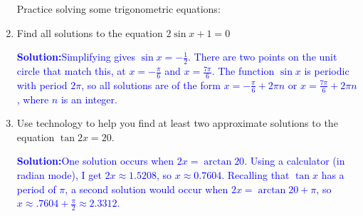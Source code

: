 \documentclass[letterpaper,11pt]{article}
\newcommand{\sol}[2]{\begin{minipage}[c][#1]{\linewidth}{\textcolor{blue}{\textbf{Solution:}}\quad \textcolor{blue}{#2}}\end{minipage}}
\newcommand{\sol}[2]{\begin{minipage}[c][#1]{\linewidth}{\vfill}\end{minipage}}
\begin{document}
\begin{enumerate}


\noindent Practice solving some trigonometric equations:

\item  Find all solutions to the equation $2\sin{x}+1=0$\\
\sol{1.2in}{Simplifying gives $\sin{x}=-\frac{1}{2}$.  There are two points on the unit circle that match this, at $x=-\frac{\pi}{6}$ and $x=\frac{7\pi}{6}$.  The function $\sin{x}$ is periodic with period $2\pi$, so all solutions are of the form $x=-\frac{\pi}{6}+2\pi n$ or
$x=\frac{7\pi}{6}+2\pi n$, where $n$ is an integer.}

\item  Use technology to help you find at least two approximate solutions to the equation $\tan{2x} = 20$.\\
\sol{1.5in}{One solution occurs when $2x=\arctan{20}$.  Using a calculator (in radian mode), I get $2x \approx 1.5208$, so $x \approx 0.7604$.  Recalling that $\tan{x}$ has a period of $\pi$, a second solution would occur when $2x =\arctan{20} + \pi$, so $x \approx .7604+\frac{\pi}{2} \approx 2.3312$.}


\end{enumerate}
\end{document}
